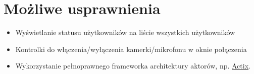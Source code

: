 \section{Możliwe usprawnienia}

\begin{itemize}
    \item Wyświetlanie statusu użytkowników na liście wszystkich użytkowników
    \item Kontrolki do włączenia/wyłączenia kamerki/mikrofonu w oknie połączenia
    \item Wykorzystanie pełnoprawnego frameworka architektury aktorów, np. \href{https://github.com/actix/actix}{Actix}.
\end{itemize}



